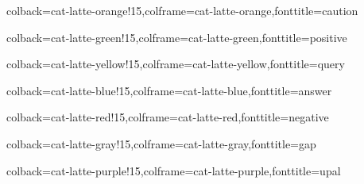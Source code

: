 \usepackage[utf8]{inputenc}
\usepackage[T1]{fontenc}
\usepackage[displaymath,mathlines,running]{lineno}
\usepackage{subcaption}      %
\usepackage{graphicx}
\usepackage{longtable}

\usepackage{amsmath}
\usepackage{amssymb}
\usepackage{amsthm}

\usepackage[hidelinks]{hyperref}

\usepackage[numbers,sort&compress]{natbib}

\usepackage[normalem]{ulem}

\usepackage[dvipsnames]{xcolor}


\usepackage{tcolorbox}

%
{colback=cat-latte-orange!15,colframe=cat-latte-orange,fonttitle=\bfseries}{caution}

%
{colback=cat-latte-green!15,colframe=cat-latte-green,fonttitle=\bfseries}{positive}

%
{colback=cat-latte-yellow!15,colframe=cat-latte-yellow,fonttitle=\bfseries}{query}

%
{colback=cat-latte-blue!15,colframe=cat-latte-blue,fonttitle=\bfseries}{answer}

%
{colback=cat-latte-red!15,colframe=cat-latte-red,fonttitle=\bfseries}{negative}

%
{colback=cat-latte-gray!15,colframe=cat-latte-gray,fonttitle=\bfseries}{gap}

%
{colback=cat-latte-purple!15,colframe=cat-latte-purple,fonttitle=\bfseries}{upal}

\usepackage{soul}


